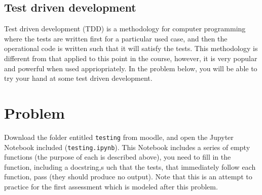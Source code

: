 \documentclass[a4paper]{article}
\begin{document}
\vspace{\baselineskip}
\begin{center}
	\noindent{}
\end{center}

\subsection{Test driven development}
Test driven development (TDD) is a methodology for computer programming where the tests are written first for a particular used case, and then the operational code is written such that it will satisfy the tests.
This methodology is different from that applied to this point in the course, however, it is very popular and powerful when used appriopriately.
In the problem below, you will be able to try your hand at some test driven development.

\section{Problem}
Download the folder entitled \texttt{testing} from moodle, and open the Jupyter Notebook included (\texttt{testing.ipynb}).
This Notebook includes a series of empty functions (the purpose of each is described above), you need to fill in the function, including a docstring,s uch that the tests, that immediately follow each function, pass (they should produce no output).
Note that this is an attempt to practice for the first assessment which is modeled after this problem.

%
%
\end{document}
